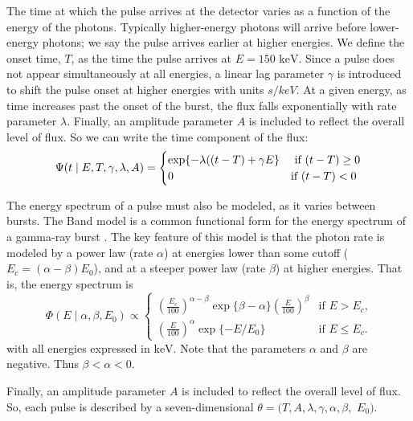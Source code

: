 \documentclass[12pt,letterpaper]{article}
\begin{document}
The time at which the pulse arrives at the detector varies as a function of the energy of the photons. Typically higher-energy photons will arrive before lower-energy photons; we say the pulse arrives earlier at higher energies. We define the onset time, $T$, as the time the pulse arrives at $E = 150 $ $\mathrm{keV}$. Since a pulse does not appear simultaneously at all energies, a linear lag parameter $\gamma$ is introduced to shift the pulse onset at higher energies with units $s/keV$.  At a given energy, as time increases past the onset of the burst, the flux falls exponentially with rate parameter $\lambda$.  Finally, an amplitude parameter $A$ is included to reflect the overall level of flux.  So we can write the time component of the flux:
     \begin{equation}\Psi( t \mid E, T, \gamma,\lambda, A) = 
     \begin{cases}
     \exp\{ -\lambda( (t-T) + \gamma E \}  & \text{ if $(t-T) \geq 0$}
     \\
     0 & \text{if $ (t - T) < 0 $}     
      \end{cases}
      \end{equation}
            
The energy spectrum of a pulse must also be modeled, as it varies between bursts.  The Band model is a common functional form for the energy spectrum of a gamma-ray burst \citet{Hurl:Ding:etal:1984}. The key feature of this model is that the photon rate is modeled by a power law (rate $\alpha$) at energies lower than some cutoff ($E_{c} = (\alpha - \beta) E_0$), and at a steeper power law (rate $\beta$) at higher energies. That is, the energy spectrum is
\begin{equation}
\Phi(E \mid \alpha, \beta, E_0) \propto  
\begin{cases} \left(\frac{E_c}{100}\right)^{\alpha - \beta} 
 \exp\{\beta - \alpha\}  \left(\frac{E}{100}\right)^\beta

 & \text{if $E > E_c $,}
\\
 \left(\frac{E}{100}\right)^\alpha \exp\{ - E/E_{0}\}

 &\text{if $E \leq E_c $.}
\end{cases}
\end{equation}
with all energies expressed in $\mathrm{keV}$. Note that the parameters $\alpha$ and $\beta$ are negative. Thus $\beta < \alpha < 0$.


Finally, an amplitude parameter $A$ is included to reflect the overall level of flux. 
So, each pulse is described by a seven-dimensional $\theta = (T, A, \lambda, \gamma, \alpha,\beta,$ $ E_0)$.
\end{document}
